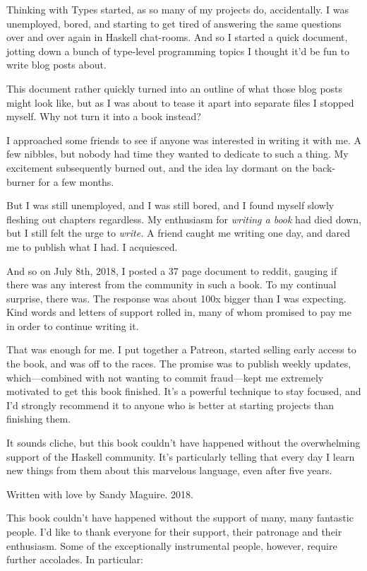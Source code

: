 \documentclass[book.tex]{subfiles}
\begin{document}

Thinking with Types started, as so many of my projects do, accidentally. I was
unemployed, bored, and starting to get tired of answering the same questions
over and over again in Haskell chat-rooms. And so I started a quick document,
jotting down a bunch of type-level programming topics I thought it'd be fun to
write blog posts about.

This document rather quickly turned into an outline of what those blog posts
might look like, but as I was about to tease it apart into separate files I
stopped myself. Why not turn it into a book instead?

I approached some friends to see if anyone was interested in writing it with me.
A few nibbles, but nobody had time they wanted to dedicate to such a thing. My
excitement subsequently burned out, and the idea lay dormant on the
back-burner for a few months.

But I was still unemployed, and I was still bored, and I found myself slowly
fleshing out chapters regardless. My enthusiasm for \emph{writing a book} had
died down, but I still felt the urge to \emph{write.} A friend caught me writing
one day, and dared me to publish what I had. I acquiesced.

And so on July 8th, 2018, I posted a 37 page document to reddit, gauging if
there was any interest from the community in such a book. To my continual
surprise, there was. The response was about 100x bigger than I was expecting.
Kind words and letters of support rolled in, many of whom promised to pay me in
order to continue writing it.

That was enough for me. I put together a Patreon, started selling early access
to the book, and was off to the races. The promise was to publish weekly
updates, which---combined with not wanting to commit fraud---kept me extremely
motivated to get this book finished. It's a powerful technique to stay focused,
and I'd strongly recommend it to anyone who is better at starting projects than
finishing them.

It sounds cliche, but this book couldn't have happened without the overwhelming
support of the Haskell community. It's particularly telling that every day I
learn new things from them about this marvelous language, even after five years.

Written with love by Sandy Maguire. 2018.



This book couldn't have happened without the support of many, many fantastic
people. I'd like to thank everyone for their support, their patronage and their
enthusiasm. Some of the exceptionally instrumental people, however, require
further accolades. In particular:
\end{document}
